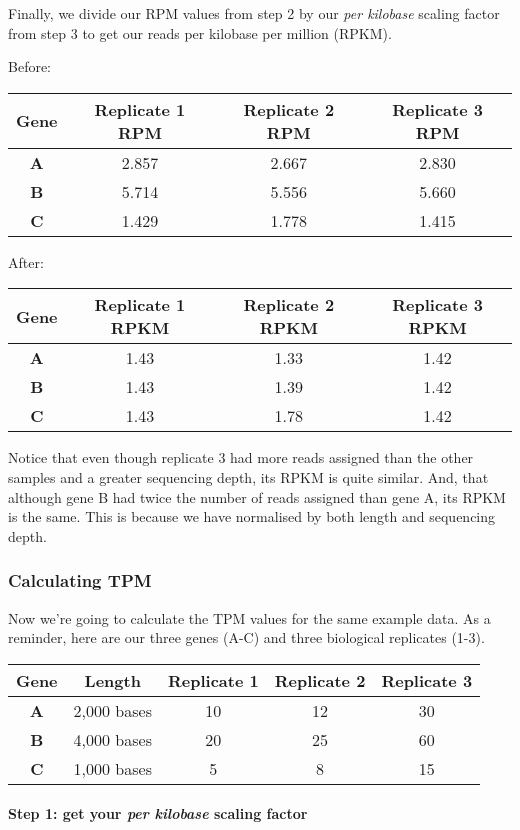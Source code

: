 \documentclass[11pt]{article}
\begin{document}
Finally, we divide our RPM values from step 2 by our \textit{per kilobase}
scaling factor from step 3 to get our reads per kilobase per million
(RPKM).

Before:

\begin{longtable}[]{@{}cccc@{}}
\hline
Gene & Replicate 1 RPM & Replicate 2 RPM & Replicate 3
RPM\tabularnewline
\hline
\endhead
\textbf{A} & 2.857 & 2.667 & 2.830\tabularnewline
\textbf{B} & 5.714 & 5.556 & 5.660\tabularnewline
\textbf{C} & 1.429 & 1.778 & 1.415\tabularnewline
\hline
\end{longtable}

After:

\begin{longtable}[]{@{}cccc@{}}
\hline
Gene & Replicate 1 RPKM & Replicate 2 RPKM & Replicate 3
RPKM\tabularnewline
\hline
\endhead
\textbf{A} & 1.43 & 1.33 & 1.42\tabularnewline
\textbf{B} & 1.43 & 1.39 & 1.42\tabularnewline
\textbf{C} & 1.43 & 1.78 & 1.42\tabularnewline
\hline
\end{longtable}

Notice that even though replicate 3 had more reads assigned than the
other samples and a greater sequencing depth, its RPKM is quite similar.
And, that although gene B had twice the number of reads assigned than
gene A, its RPKM is the same. This is because we have normalised by both
length and sequencing depth.

    \hypertarget{calculating-tpm}{%
\subsubsection{Calculating TPM}\label{calculating-tpm}}

Now we're going to calculate the TPM values for the same example data.
As a reminder, here are our three genes (A-C) and three biological
replicates (1-3).

\begin{longtable}[]{@{}ccccc@{}}
\hline
Gene & Length & Replicate 1 & Replicate 2 & Replicate 3\tabularnewline
\hline
\endhead
\textbf{A} & 2,000 bases & 10 & 12 & 30\tabularnewline
\textbf{B} & 4,000 bases & 20 & 25 & 60\tabularnewline
\textbf{C} & 1,000 bases & 5 & 8 & 15\tabularnewline
\hline
\end{longtable}

\hypertarget{step-1-get-your-per-kilobase-scaling-factor}{%
\paragraph{\texorpdfstring{Step 1: get your \textit{per kilobase} scaling
factor}{Step 1: get your per kilobase scaling factor}}\label{step-1-get-your-per-kilobase-scaling-factor}}
\end{document}
